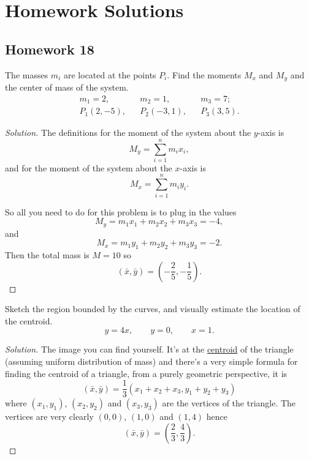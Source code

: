 \chapter{Homework Solutions}
\section{Homework 18}
\begin{problem}
The masses $m_i$ are located at the points $P_i$. Find the moments $M_x$
and $M_y$ and the center of mass of the system.
\begin{align*}
m_1=2,&&m_2=1,&&m_3=7;\\
P_1(2,-5),&&P_2(-3,1),&&P_3(3,5).
\end{align*}
\end{problem}
\begin{proof}[Solution]
The definitions for the moment of the system about the $y$-axis is
\begin{equation}
  \label{eq:moment-about-y}
M_y=\sum_{i=1}^n m_ix_i,
\end{equation}
and for the moment of the system about the $x$-axis is
\begin{equation}
  \label{eq:moment-about-x}
M_x=\sum_{i=1}^n m_iy_i.
\end{equation}

So all you need to do for this problem is to plug in the values
\[
M_y=m_1x_1+m_2x_2+m_3x_3=\boxed{-4,}
\]
and
\[
M_x=m_1y_1+m_2y_2+m_3y_3=\boxed{-2.}
\]
Then the total mass is $M=10$ so
\[
(\bar x,\bar y)=\boxed{\left(-\frac{2}{5},-\frac{1}{5}\right).}
\]
\end{proof}

\begin{problem}
Sketch the region bounded by the curves, and visually estimate the location
of the centroid.
\[
y=4x,\qquad y=0,\qquad x=1.
\]
\end{problem}
\begin{proof}[Solution]
The image you can find yourself. It's at the
\href{https://en.wikipedia.org/wiki/Centroid}{centroid} of the triangle
(assuming uniform distribution of mass) and there's a very simple formula
for finding the centroid of a triangle, from a purely geometric
perspective, it is
\begin{equation}
  \label{eq:centroid-of-triangle}
(\bar x,\bar y)=\frac{1}{3}(x_1+x_2+x_3,y_1+y_2+y_3)
\end{equation}
where $(x_1,y_1)$, $(x_2,y_2)$ and $(x_3,y_3)$ are the vertices of the
triangle. The vertices are very clearly $(0,0)$, $(1,0)$ and $(1,4)$ hence
\[
(\bar x,\bar y)=\boxed{\left(\frac{2}{3},\frac{4}{3}\right).}
\]
\end{proof}

